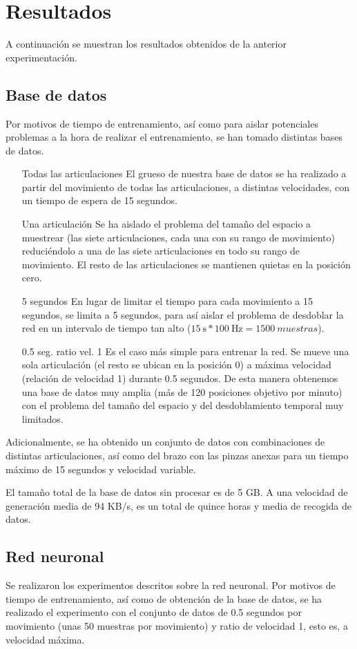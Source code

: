\section{Resultados}
A continuación se muestran los resultados obtenidos de la anterior experimentación.
\subsection{Base de datos}
Por motivos de tiempo de entrenamiento, así como para aislar potenciales problemas a la hora de realizar el entrenamiento, se han tomado distintas bases de datos.

\begin{itemize}
\item [Todas las articulaciones] El grueso de nuestra base de datos se ha realizado a partir del movimiento de todas las articulaciones, a distintas velocidades, con un tiempo de espera de 15 segundos.
\item [Una articulación] Se ha aislado el problema del tamaño del espacio a muestrear (las siete articulaciones, cada una con su rango de movimiento) reduciéndolo a una de las siete articulaciones en todo su rango de movimiento. El resto de las articulaciones se mantienen quietas en la posición cero.
\item [5 segundos] En lugar de limitar el tiempo para cada movimiento a 15 segundos, se limita a 5 segundos, para así aislar el problema de desdoblar la red en un intervalo de tiempo tan alto 
($\SI{15}{\second} * \SI{100}{\hertz} = \SI{1500}{muestras}$).
\item [0.5 seg. ratio vel. 1] Es el caso más simple para entrenar la red. Se mueve una sola articulación (el resto se ubican en la posición 0) a máxima velocidad (relación de velocidad 1) durante 0.5 segundos. De esta manera obtenemos una base de datos muy amplia (más de 120 posiciones objetivo por minuto) con el problema del tamaño del espacio y del desdoblamiento temporal muy limitados.
\end{itemize}

Adicionalmente, se ha obtenido un conjunto de datos con combinaciones de distintas articulaciones, así como del brazo con las pinzas anexas para un tiempo máximo de 15 segundos y velocidad variable.

El tamaño total de la base de datos sin procesar es de 5 GB. A una velocidad de generación media de 94 KB/s, es un total de quince horas y media de recogida de datos.

\subsection{Red neuronal}
Se realizaron los experimentos descritos sobre la red neuronal. Por motivos de tiempo de entrenamiento, así como de obtención de la base de datos, se ha realizado el experimento con el conjunto de datos de 0.5 segundos por movimiento (unas 50 muestras por movimiento) y ratio de velocidad 1, esto es, a velocidad máxima.

